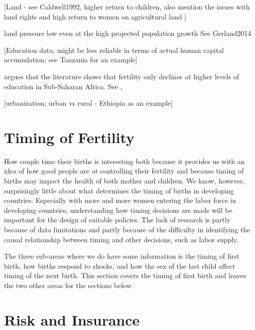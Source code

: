 \documentclass[letterpaper,12pt]{article}
\begin{document}
[Land - see Caldwell1992, higher return to children,
also mention the issues with land rights \citep{Goldstein2008}
and high return to women on agricultural land \citep{jacoby95}]

land pressure low even at the high projected  population growth
See Gerland2014

[Education data; might be less reliable in terms of actual
human capital accumulation; see Tanzania for an example]


\citet{Marchetta2016} argues that the literature shows that
fertility only declines at higher levels of education in
Sub-Saharan Africa. See  \citet{Ainsworth1996}, \citet{Thomas1996}


[urbanization; urban vs rural - Ethiopia as an example]




    

\section{Timing of Fertility}

How couple time their births is interesting both because it provides
us with an idea of how good people are at controlling their
fertility and because timing of births may impact the health
of both mother and children.
We know, however, surprisingly little about what determines the
timing of births in developing countries.
Especially with more and more women entering the labor force
in developing countries, understanding how timing decisions are made will
be important for the design of suitable policies.
The lack of research is partly because of data limitations and 
partly because of the difficulty in identifying the causal relationship 
between timing and other decisions, such as labor supply.

The three sub-areas where we do have some information is the timing of 
first birth, how births respond to shocks, and how the sex of the 
last child affect timing of the next birth.
This section covers the timing of first birth and leaves the two
other areas for the sections below.



\citet{Dupas2017}

\citet{Marchetta2016}

\citet{Duflo2015}


\section{Risk and Insurance}
\end{document}
